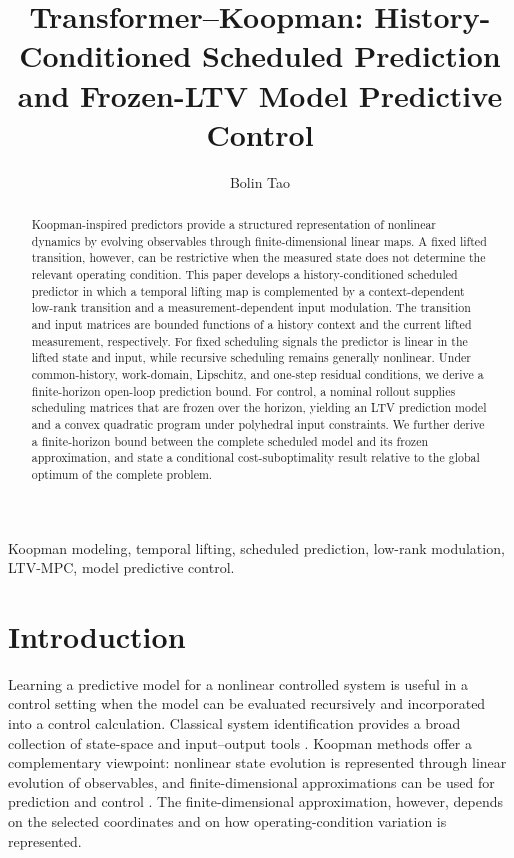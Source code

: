\documentclass[journal]{IEEEtran}
\begin{document}
\title{Transformer--Koopman: History-Conditioned Scheduled Prediction and Frozen-LTV Model Predictive Control}
\author{Bolin Tao}
\maketitle

\begin{abstract}
Koopman-inspired predictors provide a structured representation of nonlinear dynamics by evolving observables through finite-dimensional linear maps. A fixed lifted transition, however, can be restrictive when the measured state does not determine the relevant operating condition. This paper develops a history-conditioned scheduled predictor in which a temporal lifting map is complemented by a context-dependent low-rank transition and a measurement-dependent input modulation. The transition and input matrices are bounded functions of a history context and the current lifted measurement, respectively. For fixed scheduling signals the predictor is linear in the lifted state and input, while recursive scheduling remains generally nonlinear. Under common-history, work-domain, Lipschitz, and one-step residual conditions, we derive a finite-horizon open-loop prediction bound. For control, a nominal rollout supplies scheduling matrices that are frozen over the horizon, yielding an LTV prediction model and a convex quadratic program under polyhedral input constraints. We further derive a finite-horizon bound between the complete scheduled model and its frozen approximation, and state a conditional cost-suboptimality result relative to the global optimum of the complete problem.
\end{abstract}

\begin{IEEEkeywords}
Koopman modeling, temporal lifting, scheduled prediction, low-rank modulation, LTV-MPC, model predictive control.
\end{IEEEkeywords}

\section{Introduction}
\label{sec:introduction}

Learning a predictive model for a nonlinear controlled system is useful in a control setting when the model can be evaluated recursively and incorporated into a control calculation. Classical system identification provides a broad collection of state-space and input--output tools \cite{ljung1999system,vanoverschee1994n4sid,nelles2020nonlinear}. Koopman methods offer a complementary viewpoint: nonlinear state evolution is represented through linear evolution of observables, and finite-dimensional approximations can be used for prediction and control \cite{koopman1931hamiltonian,mezic2005spectral,williams2015data,korda2018linear,brunton2022modern}. The finite-dimensional approximation, however, depends on the selected coordinates and on how operating-condition variation is represented.
\end{document}
